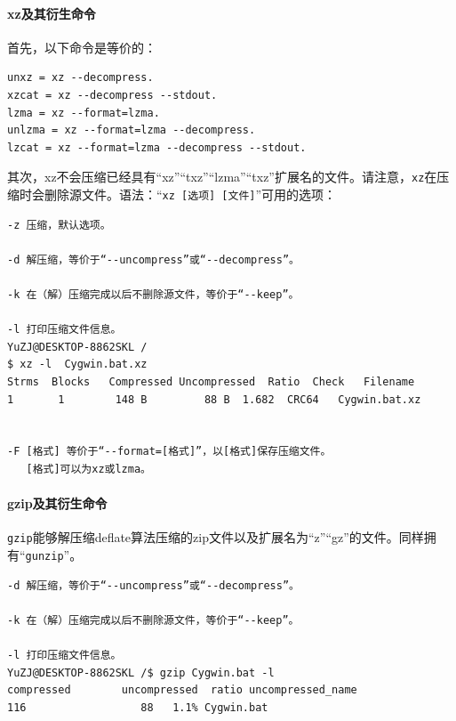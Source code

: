 \paragraph{xz及其衍生命令}
首先，以下命令是等价的：\par
\begin{verbatim}
unxz = xz --decompress.
xzcat = xz --decompress --stdout.
lzma = xz --format=lzma.
unlzma = xz --format=lzma --decompress.
lzcat = xz --format=lzma --decompress --stdout.
\end{verbatim}\par
其次，xz不会压缩已经具有“xz”“txz”“lzma”“txz”扩展名的文件。请注意，\verb|xz|在压缩时会删除源文件。语法：“\verb|xz [选项] [文件]|”可用的选项：\par
\begin{verbatim}
-z 压缩，默认选项。

-d 解压缩，等价于“--uncompress”或“--decompress”。

-k 在（解）压缩完成以后不删除源文件，等价于“--keep”。

-l 打印压缩文件信息。
YuZJ@DESKTOP-8862SKL /
$ xz -l  Cygwin.bat.xz
Strms  Blocks   Compressed Uncompressed  Ratio  Check   Filename
1       1        148 B         88 B  1.682  CRC64   Cygwin.bat.xz


-F [格式] 等价于“--format=[格式]”，以[格式]保存压缩文件。
   [格式]可以为xz或lzma。
\end{verbatim}
\paragraph{gzip及其衍生命令}
\verb|gzip|能够解压缩deflate算法压缩的zip文件以及扩展名为“z”“gz”的文件。同样拥有“\verb|gunzip|”。\par
\begin{verbatim}
-d 解压缩，等价于“--uncompress”或“--decompress”。

-k 在（解）压缩完成以后不删除源文件，等价于“--keep”。

-l 打印压缩文件信息。
YuZJ@DESKTOP-8862SKL /$ gzip Cygwin.bat -l
compressed        uncompressed  ratio uncompressed_name
116                  88   1.1% Cygwin.bat

\end{verbatim}
